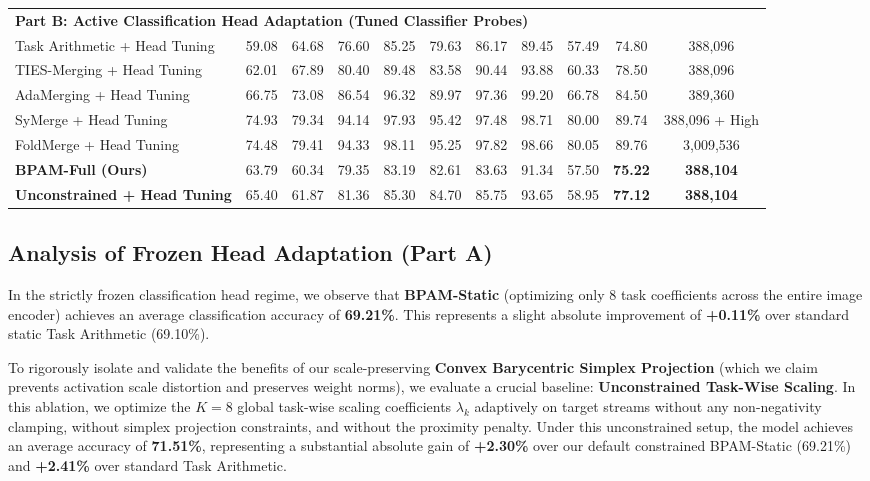\begin{table}[t]
\begin{center}
\begin{small}
\begin{sc}
\begin{tabular}{lcccccccccc}
\midrule
\multicolumn{11}{l}{\bf Part B: Active Classification Head Adaptation (Tuned Classifier Probes)} \\
Task Arithmetic + Head Tuning & 59.08 & 64.68 & 76.60 & 85.25 & 79.63 & 86.17 & 89.45 & 57.49 & 74.80 & 388,096 \\
TIES-Merging + Head Tuning & 62.01 & 67.89 & 80.40 & 89.48 & 83.58 & 90.44 & 93.88 & 60.33 & 78.50 & 388,096 \\
AdaMerging + Head Tuning & 66.75 & 73.08 & 86.54 & 96.32 & 89.97 & 97.36 & 99.20 & 66.78 & 84.50 & 389,360 \\
SyMerge + Head Tuning & 74.93 & 79.34 & 94.14 & 97.93 & 95.42 & 97.48 & 98.71 & 80.00 & 89.74 & 388,096 + High \\
FoldMerge + Head Tuning & 74.48 & 79.41 & 94.33 & 98.11 & 95.25 & 97.82 & 98.66 & 80.05 & 89.76 & 3,009,536 \\
{\bf BPAM-Full (Ours)} & 63.79 & 60.34 & 79.35 & 83.19 & 82.61 & 83.63 & 91.34 & 57.50 & {\bf 75.22} & {\bf 388,104} \\
{\bf Unconstrained + Head Tuning} & 65.40 & 61.87 & 81.36 & 85.30 & 84.70 & 85.75 & 93.65 & 58.95 & {\bf 77.12} & {\bf 388,104} \\
\bottomrule
\end{tabular}
\end{sc}
\end{small}
\end{center}
\vskip -0.1in
\end{table}

\subsection{Analysis of Frozen Head Adaptation (Part A)}
In the strictly frozen classification head regime, we observe that {\bf BPAM-Static} (optimizing only 8 task coefficients across the entire image encoder) achieves an average classification accuracy of {\bf 69.21\%}. This represents a slight absolute improvement of {\bf +0.11\%} over standard static Task Arithmetic (69.10\%). 

To rigorously isolate and validate the benefits of our scale-preserving {\bf Convex Barycentric Simplex Projection} (which we claim prevents activation scale distortion and preserves weight norms), we evaluate a crucial baseline: {\bf Unconstrained Task-Wise Scaling}. In this ablation, we optimize the $K=8$ global task-wise scaling coefficients $\lambda_k$ adaptively on target streams without any non-negativity clamping, without simplex projection constraints, and without the proximity penalty. Under this unconstrained setup, the model achieves an average accuracy of {\bf 71.51\%}, representing a substantial absolute gain of {\bf +2.30\%} over our default constrained BPAM-Static (69.21\%) and {\bf +2.41\%} over standard Task Arithmetic. 

